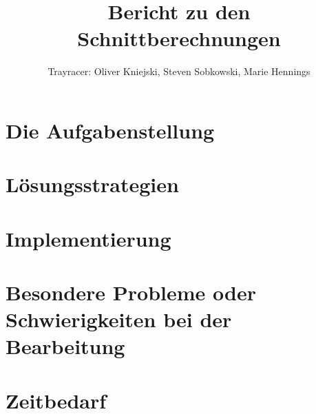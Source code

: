 \documentclass[a4paper,parskip=half,11pt]{scrartcl}
\author{Trayracer: Oliver Kniejski, Steven Sobkowski, Marie Hennings}
\title{Bericht zu den Schnittberechnungen}
\begin{document}
 
\maketitle

\section*{Die Aufgabenstellung}

\section*{Lösungsstrategien}

\section*{Implementierung}

\section*{Besondere Probleme oder Schwierigkeiten bei der Bearbeitung}

\section*{Zeitbedarf}
\end{document}
